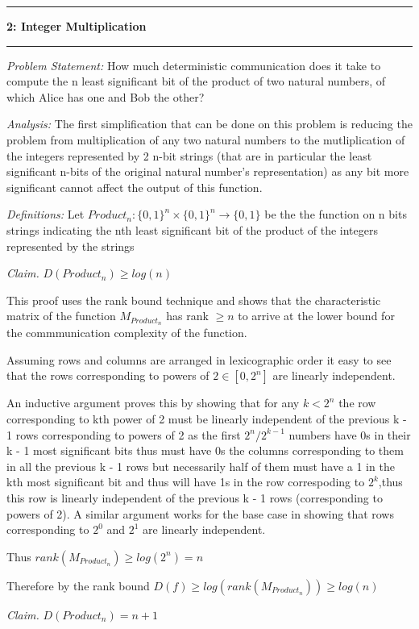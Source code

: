 \documentclass[11pt]{article}
\newcommand\question[2]{\vspace{.25in}\hrule\textbf{#1: #2}\vspace{.5em}\hrule\vspace{.10in}}
\newcommand\analysis{\vspace{.10in}\emph{Analysis: }\newline}
\newcommand\problem{\emph{Problem Statement:}\newline}
\newcommand\definitions{\emph{Definitions:}\newline}
\newcommand\claim{\emph{Claim.}\newline}
\begin{document}
\newpage

\question{2}{Integer Multiplication} 
\problem
How much deterministic communication does it take to compute the n
least significant bit of the product of two natural numbers, of which Alice has one and Bob the other?

\analysis
The first simplification that can be done on this problem is reducing the problem from multiplication of any two natural numbers to the mutliplication of the integers represented by 2 n-bit strings (that are in particular the least significant n-bits of the original natural number's representation) as any bit more significant cannot affect the output of this function. 

\definitions
Let $Product_n: {\{0, 1\}}^n \times {\{0, 1\}}^n \to \{0, 1\}$ be the the function on n bits strings indicating the nth least significant bit of the product of the integers represented by the strings

\claim
$D(Product_n) \geq log(n)$ 

\proof
This proof uses the rank bound technique and shows that the characteristic matrix of the function $M_{Product_n}$ has rank $\geq n$ to arrive at the lower bound for the commmunication complexity of the function. 

Assuming rows and columns are arranged in lexicographic order it easy to see that 
the rows corresponding to powers of $2 \in [0, 2^n]$ are linearly independent. 

An inductive argument proves this by showing that for any $k < 2^n$ the row corresponding to kth power of 2 must be linearly independent of the previous k - 1 rows corresponding to powers of 2 as the first $2^n / 2^{k-1}$ numbers have 0s in their k - 1 most significant bits thus must have 0s the columns corresponding to them in all the previous k - 1 rows but necessarily half of them must have a 1 in the kth most significant bit and thus will have 1s in the row correspoding to $2^k$,thus this row is linearly independent of the previous k - 1 rows (corresponding to powers of 2). A similar argument works for the base case in showing that rows corresponding to $2^0$ and $2^1$ are linearly independent. 

Thus $rank(M_{Product_n}) \geq log(2^n) = n$ 

Therefore by the rank bound $D(f) \geq log(rank(M_{Product_n})) \geq log(n)$\newline 


\claim
$D(Product_n) = n + 1$ 
\end{document}

